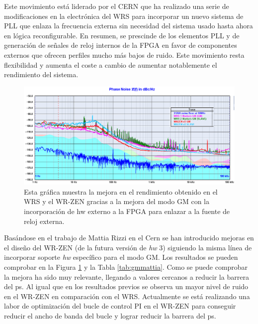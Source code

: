 Este movimiento está liderado por el CERN \cite{mattia2016-2} que ha realizado 
una serie de modificaciones en la electrónica del WRS para incorporar un nuevo 
sistema de PLL que enlaza la frecuencia externa sin necesidad del sistema usado 
hasta ahora en lógica reconfigurable. En resumen, se prescinde de los elementos 
PLL y de generación de señales de reloj internos de la FPGA en favor de 
componentes externos que ofrecen perfiles mucho más bajos de ruido. Este 
movimiento resta flexibilidad y aumenta el coste a cambio de aumentar 
notablemente el rendimiento del sistema.

\begin{figure}[H]
	\centering
	\includegraphics[width=\linewidth]{imagenes/gm_mattia}
	\caption[Resultados de la mejora del modo GM]{Esta gráfica muestra la 
		mejora en el rendimiento obtenido en el WRS y el WR-ZEN gracias a la 
		mejora 
		del modo GM con la incorporación de hw externo a la FPGA para enlazar a 
		la 
		fuente de reloj externa.}
	\label{fig:gmmattia}
\end{figure}

Basándose en el trabajo de Mattia Rizzi en el Cern se han introducido mejoras 
en el diseño del WR-ZEN (de la futura versión de \textit{hw} 3) siguiendo la 
misma línea de incorporar soporte 
\textit{hw} específico para el modo GM. Los resultados se pueden comprobar en 
la Figura \ref{fig:gmmattia} y la Tabla \ref{tab:gmmattia}. Como se puede 
comprobar la mejora ha sido muy relevante, llegando a valores cercanos a 
reducir la barrera del ps. Al igual que en los resultados previos se observa un 
mayor nivel de ruido en el WR-ZEN en comparación con el WRS. Actualmente se 
está realizando una labor de optimización del bucle de control PI en el WR-ZEN 
para conseguir reducir el ancho de banda del bucle y lograr reducir la barrera 
del ps.

